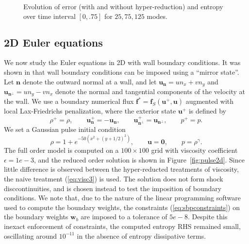 \documentclass[review]{siamart171218}
\theoremstyle{assumption}
\newcommand{\LRp}[1]{\left( #1 \right)}
\begin{document}
\begin{figure}
\caption{Evolution of error (with and without hyper-reduction) and entropy over time interval $[0,.75]$ for $25, 75, 125$ modes.}
\label{fig:entropyevo}
\end{figure}




\subsection{2D Euler equations}%

We now study the Euler equations in 2D with wall boundary conditions.  It was shown in \cite{svard2014entropy, chen2017entropy} that wall boundary conditions can be imposed using a ``mirror state''.  Let $\bm{n}$ denote the outward normal at a wall, and let $\bm{u}_{\bm{n}} = un_x + vn_y$ and $\bm{u}_{\bm{n}^\perp} = un_y - vn_x$ denote the normal and tangential components of the velocity at the wall.  We use a boundary numerical flux $\bm{f}^* = \bm{f}_S\LRp{\bm{u}^+,\bm{u}}$ augmented with local Lax-Friedrichs penalization, where the exterior state $\bm{u}^+$ is defined by
\[
\rho^+ = \rho, \qquad \bm{u}_{\bm{n}}^+ = -\bm{u}_{\bm{n}}, \qquad \bm{u}_{\bm{n}^\perp}^+ = \bm{u}_{\bm{n}^\perp}, \qquad p^+ = p.  
\]
We set a Gaussian pulse initial condition 
\[
\rho = 1 + e^{-50\LRp{x^2+(y+1/2)^2}}, \qquad \bm{u} = \bm{0}, \qquad p = \rho^{\gamma}.  
\]
The full order model is computed on a $100\times 100$ grid with viscosity coefficient $\epsilon = 1e-3$, and the reduced order solution is shown in Figure~\ref{fig:pulse2d}. Since little difference is observed between the hyper-reducted treatments of viscosity,  the naive treatment (\ref{eq:visc3}) is used.  The solution does not form shock disccontinuities, and is chosen instead to test the imposition of boundary conditions.  We note that, due to the nature of the linear programming software used to compute the boundary weights, the constraints (\ref{eq:sbpconstraints}) on the boundary weights $\bm{w}_b$ are imposed to a tolerance of $5e-8$.  Despite this inexact enforcement of constraints, the computed entropy RHS remained small, oscillating around $10^{-11}$ in the absence of entropy dissipative terms.  
\end{document}

